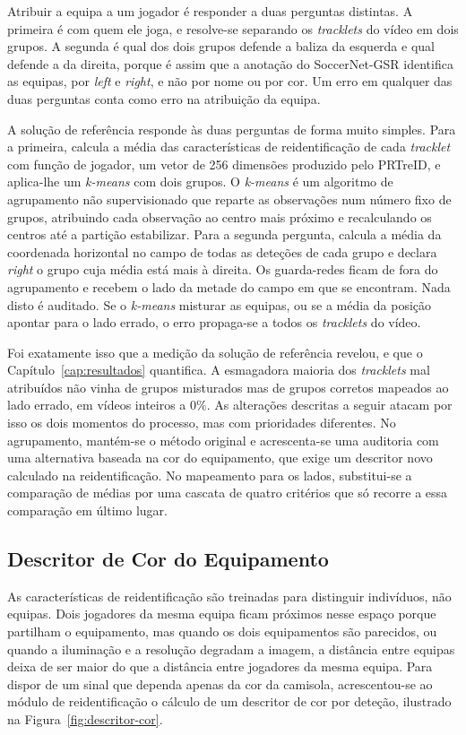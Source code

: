 Atribuir a equipa a um jogador é responder a duas perguntas distintas. A primeira é com quem ele joga, e resolve-se separando os \emph{tracklets} do vídeo em dois grupos. A segunda é qual dos dois grupos defende a baliza da esquerda e qual defende a da direita, porque é assim que a anotação do SoccerNet-GSR identifica as equipas, por \emph{left} e \emph{right}, e não por nome ou por cor. Um erro em qualquer das duas perguntas conta como erro na atribuição da equipa.

A solução de referência responde às duas perguntas de forma muito simples. Para a primeira, calcula a média das características de reidentificação de cada \emph{tracklet} com função de jogador, um vetor de 256 dimensões produzido pelo PRTreID, e aplica-lhe um \emph{k-means} com dois grupos. O \emph{k-means} é um algoritmo de agrupamento não supervisionado que reparte as observações num número fixo de grupos, atribuindo cada observação ao centro mais próximo e recalculando os centros até a partição estabilizar. Para a segunda pergunta, calcula a média da coordenada horizontal no campo de todas as deteções de cada grupo e declara \emph{right} o grupo cuja média está mais à direita. Os guarda-redes ficam de fora do agrupamento e recebem o lado da metade do campo em que se encontram. Nada disto é auditado. Se o \emph{k-means} misturar as equipas, ou se a média da posição apontar para o lado errado, o erro propaga-se a todos os \emph{tracklets} do vídeo.

Foi exatamente isso que a medição da solução de referência revelou, e que o Capítulo~\ref{cap:resultados} quantifica. A esmagadora maioria dos \emph{tracklets} mal atribuídos não vinha de grupos misturados mas de grupos corretos mapeados ao lado errado, em vídeos inteiros a $0\%$. As alterações descritas a seguir atacam por isso os dois momentos do processo, mas com prioridades diferentes. No agrupamento, mantém-se o método original e acrescenta-se uma auditoria com uma alternativa baseada na cor do equipamento, que exige um descritor novo calculado na reidentificação. No mapeamento para os lados, substitui-se a comparação de médias por uma cascata de quatro critérios que só recorre a essa comparação em último lugar.

\subsection{Descritor de Cor do Equipamento}\label{sec:descritor-cor}

As características de reidentificação são treinadas para distinguir indivíduos, não equipas. Dois jogadores da mesma equipa ficam próximos nesse espaço porque partilham o equipamento, mas quando os dois equipamentos são parecidos, ou quando a iluminação e a resolução degradam a imagem, a distância entre equipas deixa de ser maior do que a distância entre jogadores da mesma equipa. Para dispor de um sinal que dependa apenas da cor da camisola, acrescentou-se ao módulo de reidentificação o cálculo de um descritor de cor por deteção, ilustrado na Figura~\ref{fig:descritor-cor}.

